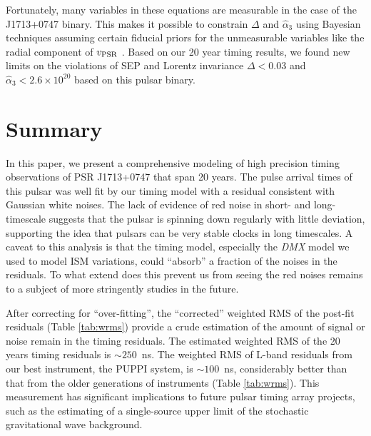 Fortunately, many variables in these equations are measurable in the
case of the J1713+0747 binary. This makes it possible to constrain $\Delta$
and $\hat{\alpha}_3$ using Bayesian techniques assuming certain fiducial
priors for the unmeasurable variables like the radial component of
$v_{\rm PSR}$ \citep{sns+05, sfl+05, gsf+11}. Based on our 20 year 
timing results, we found new
limits on the violations of SEP and Lorentz invariance $\Delta < 0.03$ and
$\hat{\alpha}_3<2.6\times10^{20}$ based on this pulsar binary.


\section{Summary}
In this paper, we present a comprehensive modeling of high precision timing observations of
PSR J1713+0747 that span 20 years. 
The pulse arrival times of this pulsar was well fit by our timing model with a
residual consistent with Gaussian white noises.
The lack of evidence of red noise in short- and long-timescale suggests that
the pulsar is spinning down regularly with little deviation, supporting the
idea that pulsars can be very stable clocks in long timescales.
A caveat to this analysis is that the timing model, especially the
\textit{DMX} model we used to model ISM variations, could ``absorb'' a fraction
of the noises in the residuals. To what extend does this prevent us from
seeing the red noises remains to a subject of more stringently studies in the
future.

After correcting for ``over-fitting'', the ``corrected'' weighted RMS of the post-fit residuals (Table \ref{tab:wrms}) provide a crude estimation of
the amount of signal or noise remain in the timing residuals. The estimated
weighted RMS of the 20 years timing residuals is $\sim 250$~ns. The weighted
RMS of L-band residuals from our best instrument, the PUPPI system, is
$\sim100$~ns, considerably better than that from the older generations of
instruments (Table \ref{tab:wrms}).
This measurement has significant implications to future pulsar timing array
projects, such as the estimating of a single-source
upper limit of the stochastic gravitational wave background.


